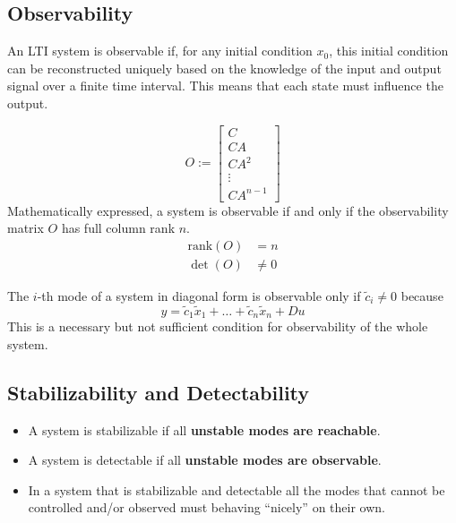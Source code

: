 

\subsection{Observability}

An LTI system is observable if, for any initial condition $x_0$, this initial condition can be reconstructed uniquely based on the knowledge of the input and output signal over a finite time interval. This means that each state must influence the output.

\begin{equation*}
    O:= \begin{bmatrix}
        C      \\
        CA     \\
        CA^2   \\
        \vdots \\
        CA^{n-1}
    \end{bmatrix}
\end{equation*}
Mathematically expressed, a system is observable if and only if the observability matrix $O$ has full column rank $n$.
\begin{align*}
    \text{rank}(O) & = n    \\
    \det(O)        & \neq 0
\end{align*}


The $i$-th mode of a system in diagonal form is observable only if $\tilde{c}_i \neq 0$ because
\begin{equation*}
    y=\tilde{c}_1\tilde{x}_1+\ldots+\tilde{c}_n\tilde{x}_n+Du
\end{equation*}
This is a necessary but not sufficient condition for observability of the whole system.

\subsection{Stabilizability and Detectability}
\begin{itemize}
    \item A system is stabilizable if all \textbf{unstable modes are reachable}.
    \item A system is detectable if all \textbf{unstable modes are observable}.
    \item In a system that is stabilizable and detectable all the modes that cannot be controlled and/or observed must behaving ``nicely'' on their own.
\end{itemize}

